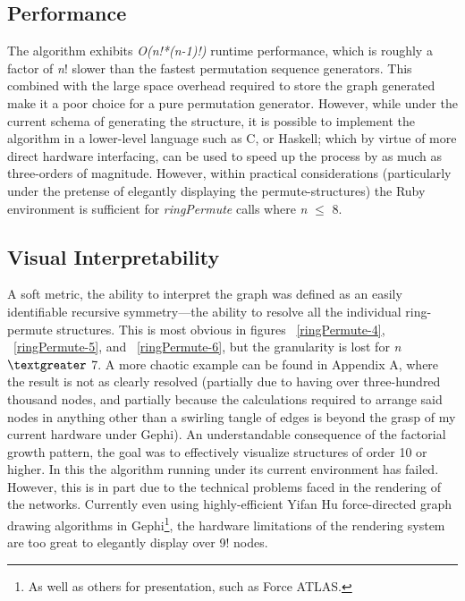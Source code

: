 \documentclass[12pt]{article}
\begin{document}
\subsection{Performance}
The algorithm exhibits \emph{O(n!*(n-1)!)} runtime performance, which is roughly a factor of \emph{n}! slower than the fastest permutation sequence generators.
This combined with the large space overhead required to store the graph generated make it a poor choice for a pure permutation generator.
However, while under the current schema of generating the structure, it is possible to implement the algorithm in a lower-level language such as C, or Haskell; which by virtue of more direct hardware interfacing, can be used to speed up the process by as much as three-orders of magnitude.
However, within practical considerations (particularly under the pretense of elegantly displaying the permute-structures) the Ruby environment is sufficient for \emph{ringPermute} calls where \emph{n} $\leq$ 8.\\

\subsection{Visual Interpretability}
A soft metric, the ability to interpret the graph was defined as an easily identifiable recursive symmetry---the ability to resolve all the individual ring-permute structures.
This is most obvious in figures ~\ref{ringPermute-4},  ~\ref{ringPermute-5}, and ~\ref{ringPermute-6}, but the granularity is lost for \emph{n} $\textgreater$ 7. A more chaotic example can be found in Appendix A, where the result is not as clearly resolved (partially due to having over three-hundred thousand nodes, and partially because the calculations required to arrange said nodes in anything other than a swirling tangle of edges is beyond the grasp of my current hardware under Gephi).
An understandable consequence of the factorial growth pattern, the goal was to effectively visualize structures of order 10 or higher.
In this the algorithm running under its current environment has failed.
However, this is in part due to the technical problems faced in the rendering of the networks.
Currently even using highly-efficient Yifan Hu force-directed graph drawing algorithms \cite{Hu:2006} in Gephi\footnote{As well as others for presentation, such as Force ATLAS.}, the hardware limitations of the rendering system are too great to elegantly display over 9\@! nodes.\\

\newpage
\end{document}
